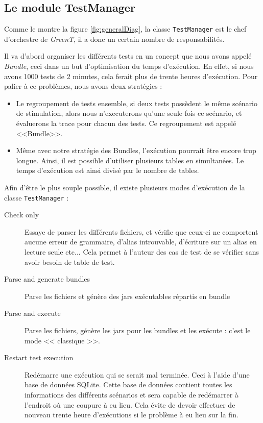 \subsection{Le module TestManager}\label{testManager}
Comme le montre la figure \ref{fig:generalDiag}, la classe \texttt{TestManager} est le chef d'orchestre de \textit{GreenT}, il a donc un certain nombre de responsabilités. 

Il va d'abord organiser les différents tests en un concept que nous avons appelé \textit{Bundle}, ceci dans un but d'optimisation du temps d'exécution. En effet, si nous avons 1000 tests de 2 minutes, cela ferait plus de trente heures d'exécution. Pour palier à ce problèmes, nous avons deux stratégies :
\begin{itemize}
	\item Le regroupement de tests ensemble, si deux tests possèdent le même scénario de stimulation, alors nous n'executerons qu'une seule fois ce scénario, et évaluerons la trace pour chacun des tests. Ce regroupement est appelé <<Bundle>>.
	\item Même avec notre stratégie des Bundles, l'exécution pourrait être encore trop longue. Ainsi, il est possible d'utiliser plusieurs tables en simultanées. Le temps d'exécution est ainsi divisé par le nombre de tables. 
\end{itemize}

Afin d'être le plus souple possible, il existe plusieurs modes d'exécution de la classe \texttt{TestManager} : 
\begin{description}
	\item[Check only] Essaye de parser les différents fichiers, et vérifie que ceux-ci ne comportent aucune erreur de grammaire, d'alias introuvable, d'écriture sur un alias en lecture seule etc... Cela permet à l'auteur des cas de test de se vérifier sans avoir besoin de table de test.
	\item[Parse and generate bundles] Parse les fichiers et génère des jars exécutables répartis en bundle
	\item[Parse and execute] Parse les fichiers, génère les jars pour les bundles et les exécute : c'est le mode << classique >>.
	\item[Restart test execution] Redémarre une exécution qui se serait mal terminée. Ceci à l'aide d'une base de données SQLite. Cette base de données contient toutes les informations des différents scénarios et sera capable de redémarrer à l'endroit où une coupure à eu lieu. Cela évite de devoir effectuer de nouveau trente heure d'exécutions si le problème à eu lieu sur la fin.
\end{description}

